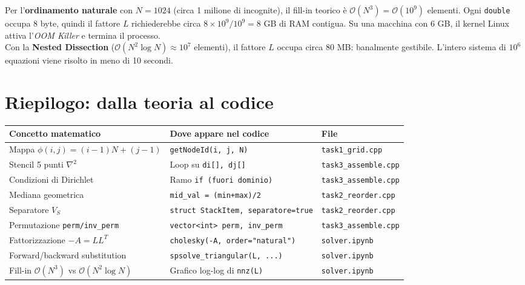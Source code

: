 \documentclass[a4paper,11pt]{article}
\theoremstyle{definition}
\begin{document}
\begin{tcolorbox}[attenzione, title={Il limite fisico della RAM: il crash OOM per $N=1024$}]
Per l'\textbf{ordinamento naturale} con $N=1024$ (circa 1 milione di incognite), il fill-in teorico è $\mathcal{O}(N^3) = \mathcal{O}(10^9)$ elementi. Ogni \texttt{double} occupa 8 byte, quindi il fattore $L$ richiederebbe circa $8 \times 10^9 / 10^9 = 8$ GB di RAM contigua. Su una macchina con 6 GB, il kernel Linux attiva l'\emph{OOM Killer} e termina il processo.\\
Con la \textbf{Nested Dissection} ($\mathcal{O}(N^2 \log N) \approx 10^7$ elementi), il fattore $L$ occupa circa 80 MB: banalmente gestibile. L'intero sistema di $10^6$ equazioni viene risolto in meno di 10 secondi.
\end{tcolorbox}

\newpage
\section{Riepilogo: dalla teoria al codice}

\begin{center}
\begin{tabular}{p{4.5cm} p{5cm} p{4cm}}
\toprule
\textbf{Concetto matematico} & \textbf{Dove appare nel codice} & \textbf{File} \\
\midrule
Mappa $\phi(i,j) = (i-1)N+(j-1)$ & \texttt{getNodeId(i, j, N)} & \texttt{task1\_grid.cpp} \\
Stencil 5 punti $\nabla^2$ & Loop su \texttt{di[], dj[]} & \texttt{task3\_assemble.cpp} \\
Condizioni di Dirichlet & Ramo \texttt{if (fuori dominio)} & \texttt{task3\_assemble.cpp} \\
Mediana geometrica & \texttt{mid\_val = (min+max)/2} & \texttt{task2\_reorder.cpp} \\
Separatore $V_S$ & \texttt{struct StackItem, separatore=true} & \texttt{task2\_reorder.cpp} \\
Permutazione \texttt{perm/inv\_perm} & \texttt{vector<int> perm, inv\_perm} & \texttt{task3\_assemble.cpp} \\
Fattorizzazione $-A = LL^T$ & \texttt{cholesky(-A, order="natural")} & \texttt{solver.ipynb} \\
Forward/backward substitution & \texttt{spsolve\_triangular(L, ...)} & \texttt{solver.ipynb} \\
Fill-in $\mathcal{O}(N^3)$ vs $\mathcal{O}(N^2\log N)$ & Grafico log-log di \texttt{nnz(L)} & \texttt{solver.ipynb} \\
\bottomrule
\end{tabular}
\end{center}
\end{document}
